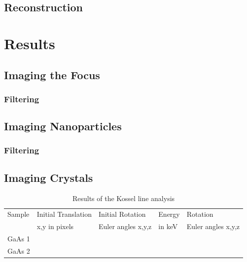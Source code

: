 \subsection{Reconstruction}




\section{Results}
\subsection{Imaging the Focus}
\subsubsection{Filtering}

\subsection{Imaging Nanoparticles}
\subsubsection{Filtering}
\subsection{Imaging Crystals}



\begin{table}[]
	\caption{Results of the Kossel line analysis}
	\begin{tabular}{lllll}
		\hline
		Sample & Initial Translation & Initial Rotation    & Energy & Rotation           \\
		& x,y in pixels      & Euler angles x,y,z & in keV    & Euler angles x,y,z \\
		\hline
		GaAs 1 &                    &                    &        &                    \\
		GaAs 2 &                    &                    &        &                   \\
		\hline
	\end{tabular}

\label{tab:kosselfit}
\end{table}
